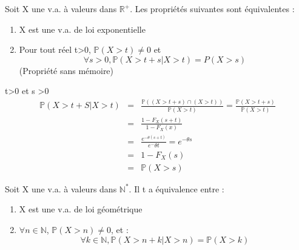 \begin{theo}
Soit X une v.a. à valeurs dans $\mathbb{R}^+$. Les propriétés suivantes sont équivalentes :
\begin{enumerate}
\item X est une v.a. de loi exponentielle
\item Pour tout réel t>0, $\mathbb{P}(X>t) \neq 0$ et \[\forall s>0, \mathbb{P}(X>t+s | X>t) = P(X>s)\] (Propriété sans mémoire)
\end{enumerate}
\end{theo}

\begin{dem}
t>0 et s >0 \\
\begin{eqnarray*}
\mathbb{P}(X>t+S | X>t) &=& \frac{\mathbb{P}\left( (X>t+s) \cap (X>t) \right)}{\mathbb{P}(X>t)} = \frac{\mathbb{P}(X>t+s)}{\mathbb{P}(X>t)} \\
&=& \frac{1-F_X(s+t)}{1-F_X(x)} \\
&=& \frac{e^{-\theta (s+t)}}{e^-{\theta t}}=e^{-\theta s} \\
&=& 1-F_X(s) \\
&=& \mathbb{P}(X>s)
\end{eqnarray*}
\end{dem}

\begin{theo}
Soit X une v.a. à valeurs dans $\mathbb{N}^*$. Il t a équivalence entre :
\begin{enumerate}
\item X est une v.a. de loi géométrique
\item $\forall n\in \mathbb{N}$, $\mathbb{P}(X>n) \neq 0$, et : \[\forall k\in \mathbb{N}, \mathbb{P}(X>n+k | X>n) = \mathbb{P}(X>k)\]
\end{enumerate}
\end{theo}

